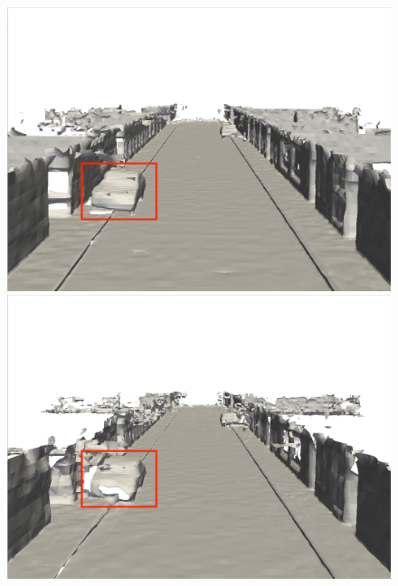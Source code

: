 \begin{figure}[htbp]
\begin{minipage}{0.5\linewidth}
\end{minipage}
\vfill
\begin{minipage}{0.5\linewidth}
    \centering
    \includegraphics[width=1\linewidth]{figures/mai_1_vox.png}
\end{minipage}\hfill
\begin{minipage}{0.5\linewidth}
    \centering
    \includegraphics[width=1\linewidth]{figures/mai_1_bce.png}
\end{minipage}
\vfill
\begin{minipage}{0.5\linewidth}
    \centering

\end{minipage}
\end{figure}
